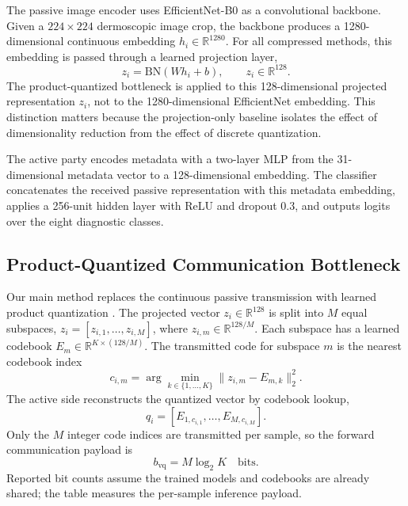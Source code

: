 \documentclass{article}
\begin{document}
The passive image encoder uses EfficientNet-B0 \citep{tan2019efficientnet} as a convolutional backbone. Given a $224 \times 224$ dermoscopic image crop, the backbone produces a 1280-dimensional continuous embedding $h_i \in \mathbb{R}^{1280}$. For all compressed methods, this embedding is passed through a learned projection layer,
\begin{equation}
    z_i = \mathrm{BN}(W h_i + b), \qquad z_i \in \mathbb{R}^{128}.
\end{equation}
The product-quantized bottleneck is applied to this 128-dimensional projected representation $z_i$, not to the 1280-dimensional EfficientNet embedding. This distinction matters because the projection-only baseline isolates the effect of dimensionality reduction from the effect of discrete quantization.

The active party encodes metadata with a two-layer MLP from the 31-dimensional metadata vector to a 128-dimensional embedding. The classifier concatenates the received passive representation with this metadata embedding, applies a 256-unit hidden layer with ReLU and dropout $0.3$, and outputs logits over the eight diagnostic classes.

\subsection{Product-Quantized Communication Bottleneck}

Our main method replaces the continuous passive transmission with learned product quantization \citep{jegou2011product}. The projected vector $z_i \in \mathbb{R}^{128}$ is split into $M$ equal subspaces, $z_i = [z_{i,1}, \ldots, z_{i,M}]$, where $z_{i,m} \in \mathbb{R}^{128/M}$. Each subspace has a learned codebook $E_m \in \mathbb{R}^{K \times (128/M)}$. The transmitted code for subspace $m$ is the nearest codebook index
\begin{equation}
    c_{i,m} = \arg\min_{k \in \{1,\ldots,K\}} \lVert z_{i,m} - E_{m,k} \rVert_2^2.
\end{equation}
The active side reconstructs the quantized vector by codebook lookup,
\begin{equation}
    q_i = [E_{1,c_{i,1}}, \ldots, E_{M,c_{i,M}}].
\end{equation}
Only the $M$ integer code indices are transmitted per sample, so the forward communication payload is
\begin{equation}
    b_{\mathrm{vq}} = M \log_2 K \quad \text{bits}.
    \label{eq:vq_bits}
\end{equation}
Reported bit counts assume the trained models and codebooks are already shared; the table measures the per-sample inference payload.
\end{document}
